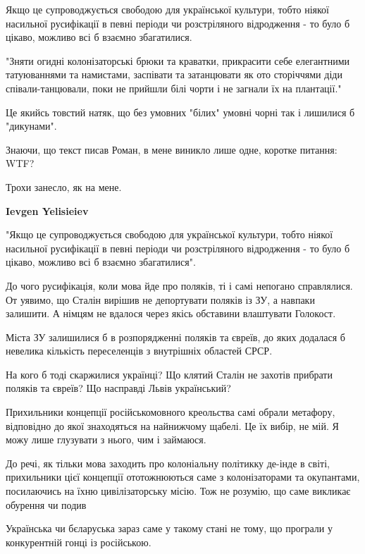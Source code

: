 \begin{itemize}
Якщо це супроводжується свободою для української культури, тобто ніякої
насильної русифікації в певні періоди чи розстріляного відродження - то було б
цікаво, можливо всі б взаємно збагатилися.

"Зняти огидні колонізаторські брюки та краватки, прикрасити себе елегантними
татуюваннями та намистами, заспівати та затанцювати як ото сторіччями діди
співали-танцювали, поки не прийшли білі чорти і не загнали їх на плантації."

Це якийсь товстий натяк, що без умовних "білих" умовні чорні так і лишилися б
"дикунами".

\begin{itemize} %
Знаючи, що текст писав Роман, в мене виникло лише одне, коротке питання: WTF?

Трохи занесло, як на мене.

\textbf{Ievgen Yelisieiev} 

"Якщо це супроводжується свободою для української культури, тобто ніякої
насильної русифікації в певні періоди чи розстріляного відродження - то було б
цікаво, можливо всі б взаємно збагатилися".

До чого русифікація, коли мова йде про поляків, ті і самі непогано справлялися.
От уявимо, що Сталін вирішив не депортувати поляків із ЗУ, а навпаки залишити.
А німцям не вдалося через якісь обставини влаштувати Голокост.

Міста ЗУ залишилися б в розпорядженні поляків та євреїв, до яких додалася б
невелика кількість переселенців з внутрішніх областей СРСР.

На кого б тоді скаржилися українці? Що клятий Сталін не захотів прибрати
поляків та євреїв? Що насправді Львів український?

Прихильники концепції російськомовного креольства самі обрали метафору,
відповідно до якої знаходяться на найнижчому щабелі. Це їх вибір, не мій. Я
можу лише глузувати з нього, чим і займаюся.

До речі, як тільки мова заходить про колоніальну політикку де-інде в світі,
прихильники цієї концепції ототожнюються саме з колонізаторами та окупантами,
посилаючись на їхню цивілізаторську місію. Тож не розумію, що саме викликає
обурення чи подив


Українська чи бєларуська зараз саме у такому стані не тому, що програли у
конкурентній гонці із російською.


\end{itemize}
\end{itemize}
